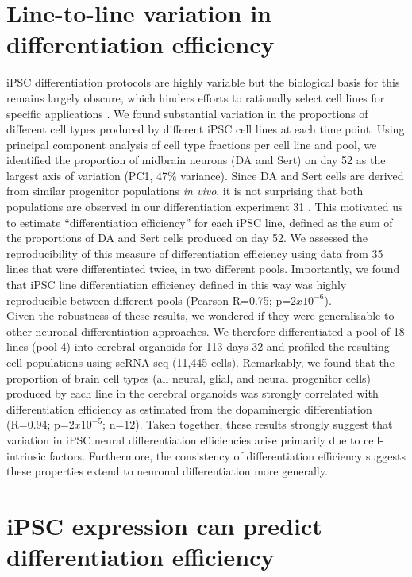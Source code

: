 \section{Line-to-line variation in differentiation efficiency}

iPSC differentiation protocols are highly variable but the biological basis for this remains largely obscure, which hinders efforts to rationally select cell lines for specific applications \cite{d2019association, volpato2018reproducibility}. 
We found substantial variation in the proportions of different cell types produced by different iPSC cell lines at each time point. 
Using principal component analysis of cell type fractions per cell line and pool, we identified the proportion of midbrain neurons (DA and Sert) on day 52 as the largest axis of variation (PC1, 47\% variance). 
Since DA and Sert cells are derived from similar progenitor populations \textit{in vivo}, it is not surprising that both populations are observed in our differentiation experiment 31 \cite{ye1998fgf}. 
This motivated us to estimate “differentiation efficiency” for each iPSC line, defined as the sum of the proportions of DA and Sert cells produced on day 52. 
We assessed the reproducibility of this measure of differentiation efficiency using data from 35 lines that were differentiated twice, in two different pools. 
Importantly, we found that iPSC line differentiation efficiency defined in this way was highly reproducible between different pools (Pearson R=0.75; p=$2x10^{-6}$).\\

Given the robustness of these results, we wondered if they were generalisable to other neuronal differentiation approaches. We therefore differentiated a pool of 18 lines (pool 4) into cerebral organoids for 113 days 32 \cite{lancaster2017guided} and profiled the resulting cell populations using scRNA-seq (11,445 cells). 
Remarkably, we found that the proportion of brain cell types (all neural, glial, and neural progenitor cells) produced by each line in the cerebral organoids was strongly correlated with differentiation efficiency as estimated from the dopaminergic differentiation (R=0.94; p=$2x10^{-5}$; n=12). 
Taken together, these results strongly suggest that variation in iPSC neural differentiation efficiencies arise primarily due to cell-intrinsic factors. 
Furthermore, the consistency of differentiation efficiency suggests these properties extend to neuronal differentiation more generally.

\section{iPSC expression can predict differentiation efficiency}


